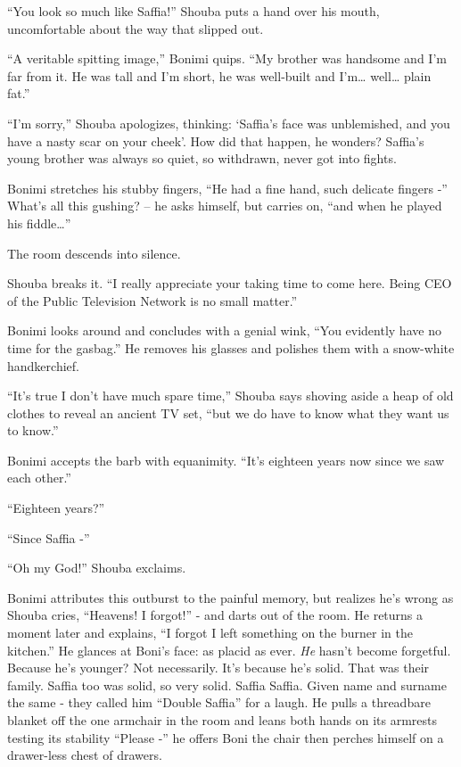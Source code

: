 \documentclass[twoside,11pt]{book}
\begin{document}
``You look so much like Saffia!'' Shouba puts a hand over his mouth, uncomfortable about the
way that slipped out.

``A veritable spitting image,'' Bonimi quips. ``My brother was handsome and I'm
far from it. He was tall and I'm short, he was well-built and I'm{\dots} well{\ldots} plain fat.''

``I'm sorry,'' Shouba apologizes, thinking: `Saffia's face was unblemished,
and you have a nasty scar on your cheek'. How did that happen, he wonders?
Saffia's young brother was always so quiet, so withdrawn, never got into fights.

Bonimi stretches his stubby fingers,
``He had a fine hand, such delicate fingers -'' What's
all this gushing? -- he asks himself, but carries on, ``and when he played his
fiddle{\dots}''

The room descends into silence.

Shouba breaks it. ``I really appreciate your taking time to come here. Being CEO of the Public Television
Network is no small matter.''

Bonimi looks around and concludes with a genial wink, ``You evidently have no time for the
gasbag.'' He removes his glasses and polishes them with a snow-white handkerchief.

``It's true I don't have much spare time,'' Shouba says shoving aside a heap of old clothes to
reveal an ancient TV set, ``but we do have to know what they want us to know.''

Bonimi accepts the barb with equanimity. ``It's eighteen years now since we saw each other.''

``Eighteen years?''

``Since Saffia -''

``Oh my God!'' Shouba exclaims.

Bonimi attributes this outburst to the painful memory, but realizes he's wrong as Shouba cries,
``Heavens! I forgot!''
- and darts out of the room. He returns a moment later and explains,
``I forgot I left something on the burner in the kitchen.'' He glances at Boni's face: as
placid as ever. \textit{He} hasn't become forgetful. Because he's younger? Not necessarily. It's because he's solid.
That was their family. Saffia too was solid, so very solid. Saffia Saffia. Given name and surname the same - they
called him ``Double Saffia'' for a laugh. He pulls a threadbare blanket off the one
armchair in  the room and leans both hands on its armrests testing its stability ``Please -''
he offers Boni the chair then perches himself on a drawer-less chest of drawers.
\end{document}
